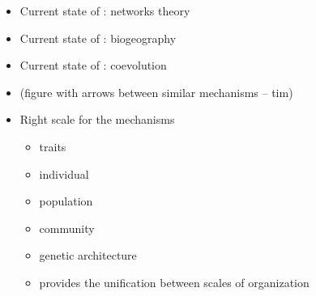 \documentclass[11pt,oneside]{article}
\begin{document}
\begin{itemize}
	\item Current state of : networks theory
	\item Current state of : biogeography
	\item Current state of : coevolution
	\item (figure with arrows between similar mechanisms -- tim)
	\item Right scale for the mechanisms
		\begin{itemize}
			\item traits
			\item individual
                        \item population
                        \item community
			\item genetic architecture
			\item provides the unification between scales of organization
		\end{itemize}
\end{itemize}
\end{document}

